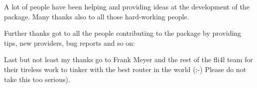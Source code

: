 A lot of people have been helping and providing ideas at the 
development of the package. Many thanks also to all those 
hard-working people.

Further thanks got to all the people contributing to the package by 
providing tips, new providers, bug reports and so on:

Last but not least my thanks go to Frank Meyer and the rest of the fli4l 
team for their tireless work to tinker with the best router in the world 
(;-) Please do not take this too serious).




